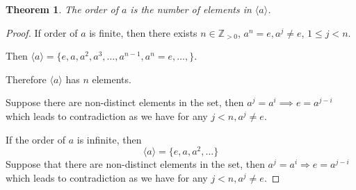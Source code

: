 \documentclass{article}
\theoremstyle{MyNonumberplain}
\theoremstyle{break}
\newtheorem*{proof}{Proof. }
\newcommand{\cyclic}[1]{\langle #1 \rangle}
\theoremstyle{break}
\newtheorem{theorem}{Theorem}[section]
\theoremstyle{break}
\theoremstyle{definition}
\theoremstyle{break}
\begin{document}
\begin{thmbox}
    \begin{theorem}
        The order of $a$ is the number of elements in $\cyclic{a}$.
    \end{theorem}    
    \begin{prfbox}
        \begin{proof}
            If order of $a$ is finite, then there exists $n \in \mathbb{Z}_{> 0}$, $a^n = e, a^j \neq
            e$, $1 \leq j < n$.\bigskip

            Then $\cyclic{a} = \{ e, a, a^2, a^3, \ldots, a^{n - 1}, a^n = e, \ldots, \}$.\bigskip

            Therefore $\cyclic{a}$ has $n$ elements.\bigskip

            Suppose there are non-distinct elements in the set, then $a^j = a^i
            \implies e = a^{j - i}$ which leads to contradiction as we have for any $j
            < n, a^j \neq e$.\bigskip

            If the order of $a$ is infinite, then
            \[ \cyclic{a} = \{ e, a, a^2, \ldots \} \]
            Suppose that there are non-distinct elements in the set, then $a^j = a^i
            \Rightarrow e = a^{j - i}$ which leads to contradiction as we have for any $j
            < n, a^j \neq e$.
        \end{proof}
    \end{prfbox}
\end{thmbox}
\end{document}

